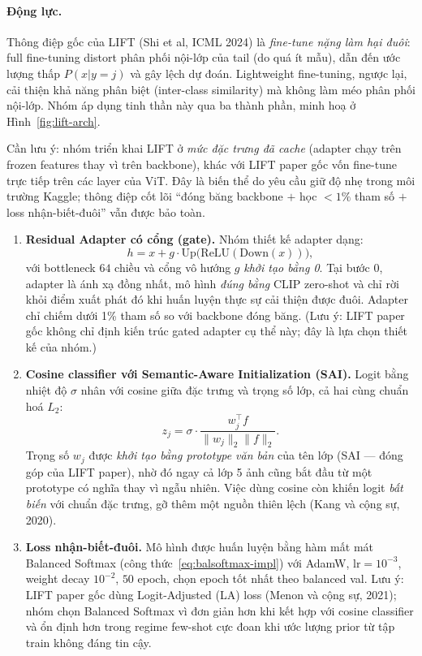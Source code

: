 \paragraph{Động lực.}
Thông điệp gốc của LIFT \cite{shi2024lift} (Shi et al, ICML 2024) là \emph{fine-tune nặng làm hại đuôi}: full
fine-tuning distort phân phối nội-lớp của tail (do quá ít mẫu), dẫn đến ước lượng thấp
$P(x|y=j)$ và gây lệch dự đoán. Lightweight fine-tuning, ngược lại, cải thiện khả năng phân biệt
(inter-class similarity) mà không làm méo phân phối nội-lớp. Nhóm áp dụng tinh thần này qua ba thành
phần, minh hoạ ở Hình~\ref{fig:lift-arch}.
 
Cần lưu ý: nhóm triển khai LIFT ở \emph{mức đặc trưng đã cache} (adapter chạy trên frozen features
thay vì trên backbone), khác với LIFT paper gốc vốn fine-tune trực tiếp trên các layer của ViT. Đây
là biến thể do yêu cầu giữ độ nhẹ trong môi trường Kaggle; thông điệp cốt lõi ``đóng băng backbone
$+$ học $<1\%$ tham số $+$ loss nhận-biết-đuôi'' vẫn được bảo toàn.


\begin{enumerate}
  \item \textbf{Residual Adapter có cổng (gate).}
        Nhóm thiết kế adapter dạng:
        \[
          h = x + g \cdot \mathrm{Up}\!\bigl(\mathrm{ReLU}(\mathrm{Down}(x))\bigr),
        \]
        với bottleneck $64$ chiều và cổng vô hướng $g$ \emph{khởi tạo bằng 0}. Tại bước 0, adapter là ánh xạ đồng nhất, mô
        hình \emph{đúng bằng} CLIP zero-shot và chỉ rời khỏi điểm xuất phát đó khi huấn luyện thực sự
        cải thiện được đuôi. Adapter chỉ chiếm dưới 1\% tham số so với backbone đóng băng. (Lưu ý: LIFT
        paper gốc không chỉ định kiến trúc gated adapter cụ thể này; đây là lựa chọn thiết kế của nhóm.)
 
  \item \textbf{Cosine classifier với Semantic-Aware Initialization (SAI).}
        Logit bằng nhiệt độ $\sigma$ nhân với cosine giữa đặc trưng và trọng số lớp, cả hai cùng chuẩn
        hoá $L_2$:
        \[
          z_j = \sigma \cdot \frac{w_j^\top f}{\|w_j\|_2 \|f\|_2}.
        \]
        Trọng số $w_j$ được \emph{khởi tạo bằng prototype văn bản} của tên lớp (SAI --- đóng góp của LIFT
        paper), nhờ đó ngay cả lớp 5 ảnh cũng bắt đầu từ một prototype có nghĩa thay vì ngẫu nhiên.
        Việc dùng cosine còn khiến logit \emph{bất biến} với chuẩn đặc trưng, gỡ thêm một nguồn thiên
        lệch (Kang và cộng sự, 2020).
 
  \item \textbf{Loss nhận-biết-đuôi.}
        Mô hình được huấn luyện bằng hàm mất mát Balanced Softmax
        (công thức~\ref{eq:balsoftmax-impl}) với AdamW, $\mathrm{lr}=10^{-3}$, weight
        decay $10^{-2}$, $50$ epoch, chọn epoch tốt nhất theo balanced val. Lưu ý: LIFT paper gốc dùng
        Logit-Adjusted (LA) loss (Menon và cộng sự, 2021); nhóm chọn Balanced Softmax vì đơn giản hơn
        khi kết hợp với cosine classifier và ổn định hơn trong regime few-shot cực đoan khi ước lượng
        prior từ tập train không đáng tin cậy.
\end{enumerate}

